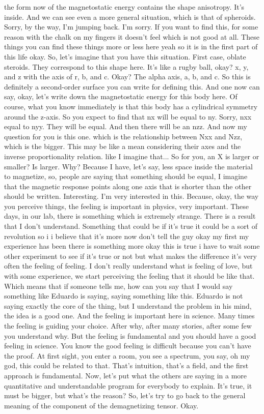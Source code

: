 the form now of the magnetostatic energy contains the shape anisotropy. It's inside. And we can see even a more general situation, which is that of spheroids. Sorry, by the way, I'm jumping back. I'm sorry. If you want to find this, for some reason with the chalk on my fingers it doesn't feel which is not good at all. These things you can find these things more or less here yeah so it is in the first part of this life okay.
So, let's imagine that you have this situation. First case, oblate steroids. They correspond to this shape here. It's like a rugby ball, okay? x, y, and z with the axis of r, b, and c. Okay? The alpha axis, a, b, and c. So this is definitely a second-order surface you can write for defining this. And one now can say, okay, let's write down the magnetostatic energy for this body here. Of course, what you know immediately is that this body has a cylindrical symmetry around the z-axis. So you expect to find that nx will be equal to ny. Sorry, nxx equal to nyy. They will be equal. And then there will be an nzz. And now my question for you is this one. which is the relationship between Nxx and Nzz, which is the bigger. This may be like a mean considering their axes and the inverse proportionality relation. like I imagine that... So for you, an X is larger or smaller? Is larger. Why? Because I have, let's say, less space inside the material to magnetize, so, people are saying that something should be equal, I imagine that the magnetic response points along one axis that is shorter than the other should be written. Interesting. I'm very interested in this. Because, okay, the way you perceive things, the feeling is important in physics, very important. These days, in our lab, there is something which is extremely strange. There is a result that I don't understand. Something that could be if it's true it could be a sort of revolution so i i believe that it's more now don't tell the guy okay my first my experience has been there is something more okay this is true i have to wait some other experiment to see if it's true or not but what makes the difference it's very often the feeling of feeling. I don't really understand what is feeling of love, but with some experience, we start perceiving the feeling that it should be like that. Which means that if someone tells me, how can you say that I would say something like Eduardo is saying, saying something like this. Eduardo is not saying exactly the core of the thing, but I understand the problem in his mind, the idea is a good one. And the feeling is important here in science. Many times the feeling is guiding your choice. After why, after many stories, after some few you understand why. But the feeling is fundamental and you should have a good feeling in science. You know the good feeling is difficult because you can't have the proof. At first sight, you enter a room, you see a spectrum, you say, oh my god, this could be related to that. That's intuition, that's a field, and the first approach is fundamental. Now, let's put what the others are saying in a more quantitative and understandable program for everybody to explain. It's true, it must be bigger, but what's the reason? So, let's try to go back to the general meaning of the component of the demagnetizing tensor. Okay. 